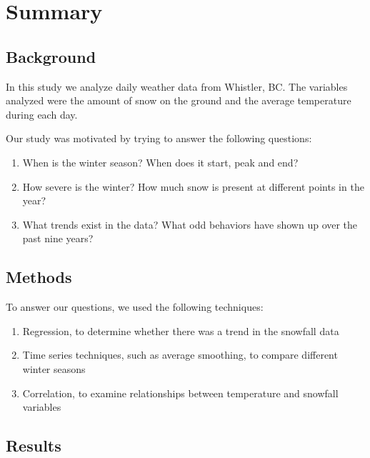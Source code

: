 \documentclass[12pt,twoside]{article}
\begin{document}




%
{%

\section{Summary}

\subsection{Background}

In this study we analyze daily weather data from Whistler, BC. The variables analyzed were the amount of snow on the ground and the average temperature during each day.

\medskip\noindent
Our study was motivated by trying to answer the following questions:

\begin{enumerate}
\item When is the winter season? When does it start, peak and end?
\item How severe is the winter? How much snow is present at different points in the year? 
\item What trends exist in the data? What odd behaviors have shown up over the past nine years? 
\end{enumerate}

\subsection{Methods}

\noindent
To answer our questions, we used the following techniques:

\begin{enumerate}
\item Regression, to determine whether there was a trend in the snowfall data
\item Time series techniques, such as average smoothing, to compare different winter seasons
\item Correlation, to examine relationships between temperature and snowfall variables
\end{enumerate}

\subsection{Results}

}
\end{document}
